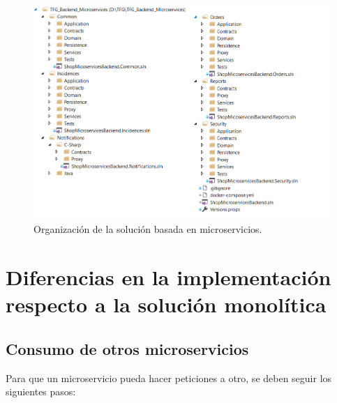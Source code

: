 \documentclass[11pt,spanish,listoffigures]{tfgetsinf}
\begin{document}
\begin{figure}[h]
\centering
\includegraphics[scale=0.85]{MicroservicesSolution}
\caption{Organización de la solución basada en microservicios.}
\label{fig:MicroservicesSolution}
\end{figure}

\section{Diferencias en la implementación respecto a la solución monolítica}

\subsection{Consumo de otros microservicios} \label{subsect:Consumo}

Para que un microservicio pueda hacer peticiones a otro, se deben seguir los siguientes pasos:
\end{document}
